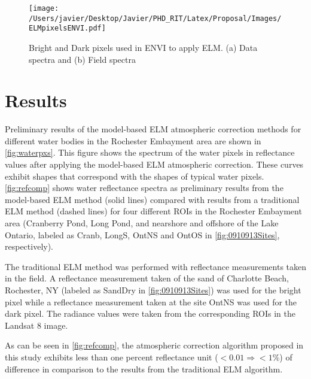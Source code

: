 \documentclass[]{spie}  %
\begin{document}
\begin{figure}[htb]
  \centering
  \texttt{[image: /Users/javier/Desktop/Javier/PHD\_RIT/Latex/Proposal/Images/ELMpixelsENVI.pdf]}
  \caption{Bright and Dark pixels used in ENVI to apply ELM. (a) Data spectra and (b) Field spectra \label{fig:ELMpxsENVI} } 
\end{figure}
\section{Results}
Preliminary results of the model-based ELM atmospheric correction methods for different water bodies in the Rochester Embayment area are shown in \autoref{fig:waterpxs}. This figure shows the spectrum of the water pixels in reflectance values after applying the model-based ELM atmospheric correction. These curves exhibit shapes that correspond with the shapes of typical water pixels. \autoref{fig:refcomp} shows water reflectance spectra as preliminary results from the model-based ELM method (solid lines) compared with results from a traditional ELM method (dashed lines) for four different ROIs in the Rochester Embayment area (Cranberry Pond, Long Pond, and nearshore and offshore of the Lake Ontario, labeled as Cranb, LongS, OntNS and OntOS in \autoref{fig:0910913Sites}, respectively). 

The traditional ELM method was performed with reflectance measurements taken in the field. A reflectance measurement taken of the sand of Charlotte Beach, Rochester, NY (labeled as SandDry in \autoref{fig:0910913Sites}) was used for the bright pixel while a reflectance measurement taken at the site OntNS was used for the dark pixel. The radiance values were taken from the corresponding ROIs in the Landsat 8 image. 

As can be seen in \autoref{fig:refcomp}, the atmospheric correction algorithm proposed in this study exhibits less than one percent reflectance unit ($<0.01\Rightarrow <1\%$) of difference in comparison to the results from the traditional ELM algorithm.
\end{document}
